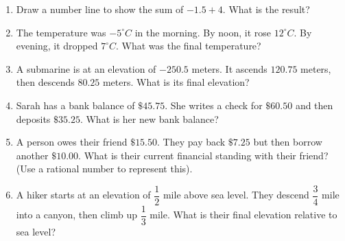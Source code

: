 \documentclass[12pt, letterpaper, fleqn]{article}
\begin{document}
\begin{enumerate}[itemsep=5.5cm, leftmargin=0.6cm, resume]
\item Draw a number line to show the sum of $-1.5 + 4$. What is the result?
\vspace{2.5cm}
\item The temperature was $-5^\circ C$ in the morning. By noon, it rose $12^\circ C$. By evening, it dropped $7^\circ C$. What was the final temperature?
\vspace{1.5cm}
\item A submarine is at an elevation of $-250.5$ meters. It ascends $120.75$ meters, then descends $80.25$ meters. What is its final elevation?
\vspace{1.5cm}
\item Sarah has a bank balance of $\$45.75$. She writes a check for $\$60.50$ and then deposits $\$35.25$. What is her new bank balance?
\vspace{1.5cm}
\item A person owes their friend $\$15.50$. They pay back $\$7.25$ but then borrow another $\$10.00$. What is their current financial standing with their friend? (Use a rational number to represent this).
\vspace{1.5cm}
\item A hiker starts at an elevation of $\dfrac{1}{2}$ mile above sea level. They descend $\dfrac{3}{4}$ mile into a canyon, then climb up $\dfrac{1}{3}$ mile. What is their final elevation relative to sea level?
\vspace{1.5cm}
\end{enumerate}
\end{document}
